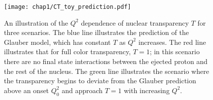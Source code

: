 \begin{figure}[!h]
    \centering
    \texttt{[image: chap1/CT\_toy\_prediction.pdf]}
    \caption[ An illustration of the $Q^2$ dependence of nuclear transparency $T$
            for three scenarios.]{
            An illustration of the $Q^2$ dependence of nuclear transparency $T$
            for three scenarios.
            The blue line illustrates the prediction of the Glauber model,
            which has constant $T$ as $Q^2$ increases.
            The red line illustrates that for full color transparency, $T=1$;
            in this scenario there are no final state interactions between the
            ejected proton and the rest of the nucleus.
            The green line illustrates the scenario where the transparency
            begins to deviate from the Glauber prediction above an onset
            $Q_0^2$ and approach $T=1$ with increasing $Q^2$.
            }
    \label{fig:CT_toy_prediction}
\end{figure}
